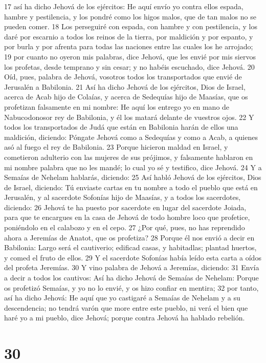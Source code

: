 17 así ha dicho Jehová de los ejércitos: He aquí envío yo contra ellos espada, hambre y pestilencia, y los pondré como los higos malos, que de tan malos no se pueden comer.
18 Los perseguiré con espada, con hambre y con pestilencia, y los daré por escarnio a todos los reinos de la tierra, por maldición y por espanto, y por burla y por afrenta para todas las naciones entre las cuales los he arrojado;
19 por cuanto no oyeron mis palabras, dice Jehová, que les envié por mis siervos los profetas, desde temprano y sin cesar; y no habéis escuchado, dice Jehová.
20 Oíd, pues, palabra de Jehová, vosotros todos los transportados que envié de Jerusalén a Babilonia.
21 Así ha dicho Jehová de los ejércitos, Dios de Israel, acerca de Acab hijo de Colaías, y acerca de Sedequías hijo de Maasías, que os profetizan falsamente en mi nombre: He aquí los entrego yo en mano de Nabucodonosor rey de Babilonia, y él los matará delante de vuestros ojos.
22 Y todos los transportados de Judá que están en Babilonia harán de ellos una maldición, diciendo: Póngate Jehová como a Sedequías y como a Acab, a quienes asó al fuego el rey de Babilonia.
23 Porque hicieron maldad en Israel, y cometieron adulterio con las mujeres de sus prójimos, y falsamente hablaron en mi nombre palabra que no les mandé; lo cual yo sé y testifico, dice Jehová.
24 Y a Semaías de Nehelam hablarás, diciendo:
25 Así habló Jehová de los ejércitos, Dios de Israel, diciendo: Tú enviaste cartas en tu nombre a todo el pueblo que está en Jerusalén, y al sacerdote Sofonías hijo de Maasías, y a todos los sacerdotes, diciendo:
26 Jehová te ha puesto por sacerdote en lugar del sacerdote Joiada, para que te encargues en la casa de Jehová de todo hombre loco que profetice, poniéndolo en el calabozo y en el cepo.
27 ¿Por qué, pues, no has reprendido ahora a Jeremías de Anatot, que os profetiza?
28 Porque él nos envió a decir en Babilonia: Largo será el cautiverio; edificad casas, y habitadlas; plantad huertos, y comed el fruto de ellos.
29 Y el sacerdote Sofonías había leído esta carta a oídos del profeta Jeremías.
30 Y vino palabra de Jehová a Jeremías, diciendo:
31 Envía a decir a todos los cautivos: Así ha dicho Jehová de Semaías de Nehelam: Porque os profetizó Semaías, y yo no lo envié, y os hizo confiar en mentira;
32 por tanto, así ha dicho Jehová: He aquí que yo castigaré a Semaías de Nehelam y a su descendencia; no tendrá varón que more entre este pueblo, ni verá el bien que haré yo a mi pueblo, dice Jehová; porque contra Jehová ha hablado rebelión.

\chapter{30}

